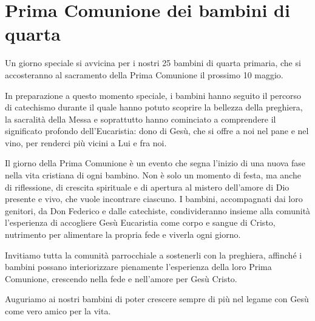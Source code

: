 \section{Prima Comunione dei bambini di quarta}

Un giorno speciale si avvicina per i nostri 25 bambini di quarta primaria, che si accosteranno al sacramento della Prima Comunione il prossimo 10 maggio.

In preparazione a questo momento speciale, i bambini hanno seguito il percorso di catechismo durante il quale hanno potuto scoprire la bellezza della preghiera, la sacralità della Messa e soprattutto hanno cominciato a comprendere il significato profondo dell'Eucaristia: dono di Gesù, che si offre a noi nel pane e nel vino, per renderci più vicini a Lui e fra noi.

Il giorno della Prima Comunione è un evento che segna l'inizio di una nuova fase nella vita cristiana di ogni bambino. Non è solo un momento di festa, ma anche di riflessione, di crescita spirituale e di apertura al mistero dell'amore di Dio presente e vivo, che vuole incontrare ciascuno. I bambini, accompagnati dai loro genitori, da Don Federico e dalle catechiste, condivideranno insieme alla comunità l'esperienza di accogliere Gesù Eucaristia come corpo e sangue di Cristo, nutrimento per alimentare la propria fede e viverla ogni giorno.

Invitiamo tutta la comunità parrocchiale a sostenerli con la preghiera, affinché i bambini possano interiorizzare pienamente l'esperienza della loro Prima Comunione, crescendo nella fede e nell'amore per Gesù Cristo.

Auguriamo ai nostri bambini di poter crescere sempre di più nel legame con Gesù come vero amico per la vita.



\clearpage

